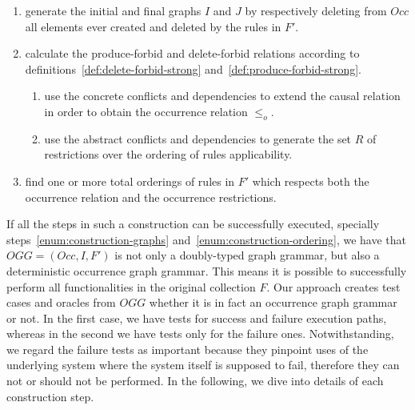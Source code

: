 \begin{definition}
\begin{enumerate}
\item\label{enum:construction-graphs} generate the initial and final graphs $I$ and $J$ by respectively deleting from $Occ$ all elements ever created and deleted by the rules in $F'$.

\item\label{enum:construction-occurrence} calculate the produce-forbid and delete-forbid relations according to definitions~\ref{def:delete-forbid-strong} and~\ref{def:produce-forbid-strong}.

\begin{enumerate}
\item\label{enum:construction-analysis} use the concrete conflicts and dependencies to extend the causal relation in order to obtain the occurrence relation $\leq_o$.

\item\label{enum:construction-restriction} use the abstract conflicts and dependencies to generate the set $R$ of restrictions over the ordering of rules applicability.
\end{enumerate}

\item\label{enum:construction-ordering} find one or more total orderings of rules in $F'$ which respects both the occurrence relation and the occurrence restrictions.
\end{enumerate}

\end{definition}

If all the steps in such a construction can be successfully executed, specially steps~\ref{enum:construction-graphs} and~\ref{enum:construction-ordering}, we have that $OGG = (Occ, I, F')$ is not only a doubly-typed graph grammar, but also a deterministic occurrence graph grammar. This means it is possible to successfully perform all functionalities in the original collection $F$. Our approach creates test cases and oracles from $OGG$ whether it is in
fact an occurrence graph grammar or not. In the first case, we have tests for success and failure execution paths, whereas in the second we have tests only for the failure ones. Notwithstanding, we regard the failure tests as important because they pinpoint uses of the underlying system where the system itself is supposed to fail, therefore they can not or should not be performed. In the following, we dive into details of each construction step.

